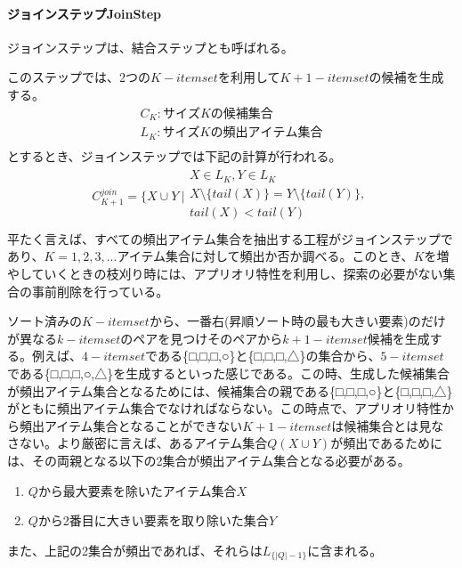 \documentclass[dvipdfmx]{jsarticle}
\begin{document}
\paragraph{ジョインステップJoinStep}ジョインステップは、結合ステップとも呼ばれる。\par
このステップでは、2つの$K-itemset$を利用して$K+1-itemset$の候補を生成する。
\begin{gather*}
  C_{K}:サイズKの候補集合 \\
  L_{K}:サイズKの頻出アイテム集合 \\
\end{gather*}
とするとき、ジョインステップでは下記の計算が行われる。
\begin{gather*}
  C_{K+1}^{join} = \{X \cup Y\ |
  \left.
  \begin{array}{l}
    X \in L_{K}, Y \in L_{K} \\
    X \setminus \{tail(X)\} = Y \setminus \{tail(Y)\}, \\
    tail(X) < tail(Y) \\
  \end{array}
  \right.
\end{gather*}
平たく言えば、すべての頻出アイテム集合を抽出する工程がジョインステップであり、$K = 1,2,3,...$アイテム集合に対して頻出か否か調べる。このとき、$K$を増やしていくときの枝刈り時には、アプリオリ特性を利用し、探索の必要がない集合の事前削除を行っている。\par
ソート済みの$K-itemset$から、一番右(昇順ソート時の最も大きい要素)のだけが異なる$k-itemset$のペアを見つけそのペアから$k+1-itemset$候補を生成する。例えば、$4-itemset$である\{□,□,□,○\}と\{□,□,□,△\}の集合から、$5-itemset$である\{□,□,□,○,△\}を生成するといった感じである。この時、生成した候補集合が頻出アイテム集合となるためには、候補集合の親である\{□,□,□,○\}と\{□,□,□,△\}がともに頻出アイテム集合でなければならない。この時点で、アプリオリ特性から頻出アイテム集合となることができない$K+1-itemset$は候補集合とは見なさない。より厳密に言えば、あるアイテム集合$Q(X\cup Y)$が頻出であるためには、その両親となる以下の2集合が頻出アイテム集合となる必要がある。
\begin{enumerate}
  \item $Q$から最大要素を除いたアイテム集合$X$
  \item $Q$から2番目に大きい要素を取り除いた集合$Y$
\end{enumerate}
また、上記の2集合が頻出であれば、それらは$L_{\{|Q|-1\}}$に含まれる。
\end{document}
